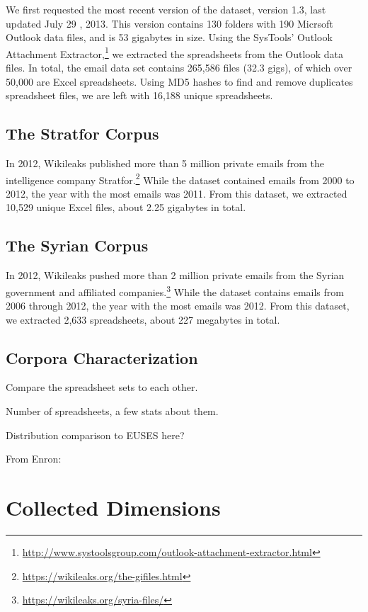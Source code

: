 \documentclass[conference]{IEEEtran}
\begin{document}
We first requested the most recent version of the dataset, 
version 1.3, last updated July 29 , 2013. This version contains 130
folders with 190 Micrsoft Outlook data files, and is 53 gigabytes in size.
Using the SysTools' Outlook Attachment 
Extractor,\footnote{\url{http://www.systoolsgroup.com/outlook-attachment-extractor.html}} 
we extracted the spreadsheets from the Outlook data files. 
In total, the email data set
contains 265,586 files (32.3 gigs), of which over 50,000 are Excel spreadsheets. 
Using MD5 hashes to find and remove duplicates spreadsheet files,
we are left with 16,188 unique spreadsheets.

\subsection{The Stratfor Corpus}

In 2012, Wikileaks published more than 5 million private emails from the
intelligence company Stratfor.\footnote{\url{https://wikileaks.org/the-gifiles.html}}
While the dataset contained emails from 2000 to 2012, 
the year with the most emails was 2011.
From this dataset, we extracted 10,529 
unique Excel files, about 2.25 gigabytes in total.

\subsection{The Syrian Corpus}

In 2012, Wikileaks pushed more than 2 million private emails from
the Syrian government and affiliated companies.\footnote{\url{https://wikileaks.org/syria-files/}}
While the dataset contains emails from 2006 through 2012, 
the year with the most emails was 2012.
From this dataset, we extracted 2,633 spreadsheets, about 227 megabytes in total.

\subsection{Corpora Characterization}

Compare the spreadsheet sets to each other.

Number of spreadsheets, a few stats about them.

Distribution comparison to EUSES here?

From Enron:

\section{Collected Dimensions}
\end{document}
